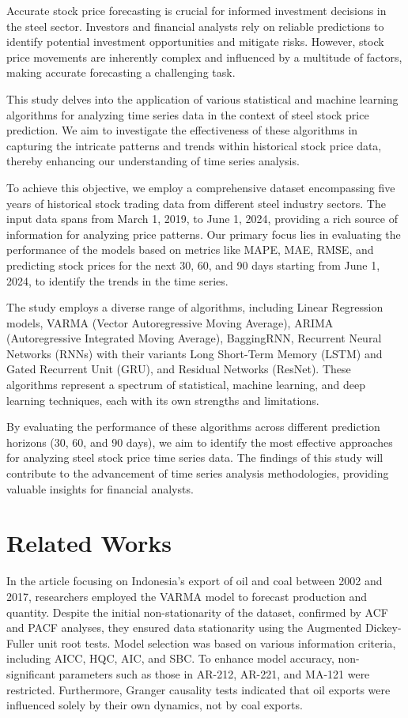 \documentclass{ieeeojies}
\begin{document}
Accurate stock price forecasting is crucial for informed investment decisions in the steel sector. Investors and financial analysts rely on reliable predictions to identify potential investment opportunities and mitigate risks. However, stock price movements are inherently complex and influenced by a multitude of factors, making accurate forecasting a challenging task.

This study delves into the application of various statistical and machine learning algorithms for analyzing time series data in the context of steel stock price prediction. We aim to investigate the effectiveness of these algorithms in capturing the intricate patterns and trends within historical stock price data, thereby enhancing our understanding of time series analysis.

To achieve this objective, we employ a comprehensive dataset encompassing five years of historical stock trading data from different steel industry sectors. The input data spans from March 1, 2019, to June 1, 2024, providing a rich source of information for analyzing price patterns. Our primary focus lies in evaluating the performance of the models based on metrics like MAPE, MAE, RMSE, and predicting stock prices for the next 30, 60, and 90 days starting from June 1, 2024, to identify the trends in the time series.

The study employs a diverse range of algorithms, including Linear Regression models, VARMA (Vector Autoregressive Moving Average), ARIMA (Autoregressive Integrated Moving Average), BaggingRNN, Recurrent Neural Networks (RNNs) with their variants Long Short-Term Memory (LSTM) and Gated Recurrent Unit (GRU), and Residual Networks (ResNet). These algorithms represent a spectrum of statistical, machine learning, and deep learning techniques, each with its own strengths and limitations.

By evaluating the performance of these algorithms across different prediction horizons (30, 60, and 90 days), we aim to identify the most effective approaches for analyzing steel stock price time series data. The findings of this study will contribute to the advancement of time series analysis methodologies, providing valuable insights for financial analysts.

\section{Related Works}

In the article \cite{b1} focusing on Indonesia's export of oil and coal between 2002 and 2017, researchers employed the VARMA model to forecast production and quantity. Despite the initial non-stationarity of the dataset, confirmed by ACF and PACF analyses, they ensured data stationarity using the Augmented Dickey-Fuller unit root tests. Model selection was based on various information criteria, including AICC, HQC, AIC, and SBC. To enhance model accuracy, non-significant parameters such as those in AR-212, AR-221, and MA-121 were restricted. Furthermore, Granger causality tests indicated that oil exports were influenced solely by their own dynamics, not by coal exports.
\end{document}
